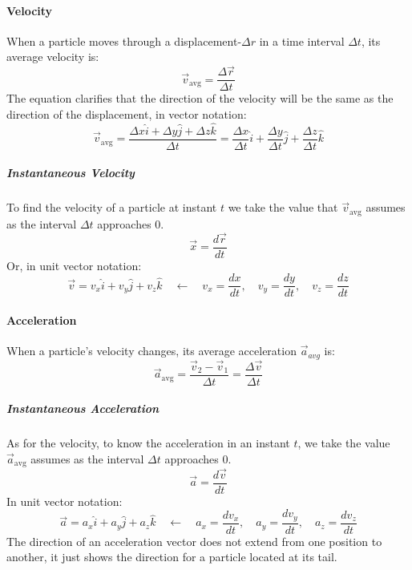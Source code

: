 \documentclass{scrartcl}
\begin{document}
    \paragraph{Velocity} When a particle moves through a displacement-$\Delta r$ in a time interval $\Delta t$, its average velocity is:
    \begin{equation}
        \vec{v}_{\mathrm{avg}} = \frac{\Delta\vec{r}}{\Delta t}
    \end{equation}
    The equation clarifies that the direction of the velocity will be the same as the direction of the displacement, in vector notation:
    \begin{equation}
        \vec{v}_{\mathrm{avg}} = \frac{\Delta x \hat{i} + \Delta y \hat{j} + \Delta z \hat{k}}{\Delta t} = \frac{\Delta x}{\Delta t} \hat{i} + \frac{\Delta y}{\Delta t} \hat{j} + \frac{\Delta z}{\Delta t} \hat{k}
    \end{equation}
    \subparagraph{Instantaneous Velocity} To find the velocity of a particle at instant $t$ we take the value that $\vec{v}_{\mathrm{avg}}$ assumes as the interval $\Delta t$ approaches $0$.
    \begin{equation}
        \vec{x} = \frac{d\vec{r}}{dt}
    \end{equation}
    Or, in unit vector notation:
    \begin{equation}
        \vec{v} = v_x \hat{i} + v_y \hat{j} + v_z \hat{k}\quad \leftarrow\quad v_x= \frac{dx}{dt},\quad v_y= \frac{dy}{dt},\quad v_z= \frac{dz}{dt}
    \end{equation}
    \paragraph{Acceleration} When a particle's velocity changes, its average acceleration $\vec{a}_{avg}$ is:
    \begin{equation}
        \vec{a}_{\mathrm{avg}} = \frac{\vec{v}_2 - \vec{v}_1}{\Delta t} = \frac{\Delta \vec{v} }{\Delta t}
    \end{equation}
    \subparagraph{Instantaneous Acceleration} As for the velocity, to know the acceleration in an instant $t$, we take the value $\vec{a}_{\mathrm{avg}}$ assumes as the interval $\Delta{t}$ approaches $0$.
    \begin{equation}
        \vec{a} = \frac{d\vec{v}}{dt}
    \end{equation}
    In unit vector notation:
    \begin{equation}
        \vec{a} = a_x \hat{i} + a_y \hat{j} + a_z \hat{k}\quad\leftarrow\quad a_x = \frac{dv_x}{dt},\quad a_y = \frac{dv_y}{dt},\quad a_z = \frac{dv_z}{dt}
    \end{equation}
    The direction of an acceleration vector does not extend from one position to another, it just shows the direction for a particle located at its tail.
\end{document}
